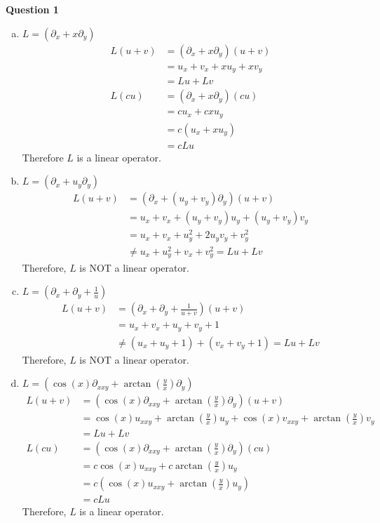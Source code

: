 \documentclass[12pt, letterpaper]{article}
\begin{document}
\graphicspath{ {./} }


\noindent \textbf{Question 1}
\begin{enumerate}[(a)]
    \item $L = (\partial_x + x\partial_y)$
    \begin{align*}
        L(u + v) &= (\partial_x + x\partial_y)(u+v) \\
        &= u_x + v_x + xu_y + xv_y \\
        &= Lu + Lv \\
        L(cu) &= (\partial_x + x\partial_y)(cu) \\
        &= cu_x + cxu_y \\
        &= c(u_x + xu_y) \\
        &= cLu
    \end{align*}
    Therefore $L$ is a linear operator.
    \item $L = (\partial_x + u_y\partial_y)$
    \begin{align*}
        L(u + v) &= (\partial_x + (u_y + v_y)\partial_y)(u+v) \\
        &= u_x + v_x + (u_y + v_y)u_y + (u_y + v_y)v_y \\
        &= u_x + v_x + u_y^2 + 2u_yv_y + v_y^2 \\
        &\ne u_x + u_y^2 + v_x + v_y^2 = Lu + Lv
    \end{align*}
    Therefore, $L$ is NOT a linear operator.
    \item $L = (\partial_x + \partial_y + \frac 1u)$
    \begin{align*}
        L(u + v) &= (\partial_x + \partial_y + \frac 1{u+v})(u+v) \\
        &= u_x + v_x + u_y + v_y + 1\\
        &\ne (u_x + u_y + 1) + (v_x + v_y + 1) = Lu + Lv
    \end{align*}
    Therefore, $L$ is NOT a linear operator.
    \item $L = (\cos(x)\partial_{xxy} + \arctan(\frac yx)\partial_y)$
    \begin{align*}
        L(u+v) &= (\cos(x)\partial_{xxy} + \arctan(\frac yx)\partial_y)(u+v) \\
        &= \cos(x)u_{xxy} + \arctan(\frac yx)u_y + \cos(x)v_{xxy} + \arctan(\frac yx)v_y \\
        &= Lu + Lv \\
        L(cu) &= (\cos(x)\partial_{xxy} + \arctan(\frac yx)\partial_y)(cu)\\
        &= c\cos(x)u_{xxy} + c\arctan(\frac yx)u_y \\
        &= c(\cos(x)u_{xxy} + \arctan(\frac yx)u_y) \\
        &= cLu
    \end{align*}
    Therefore, $L$ is a linear operator.
\end{enumerate}
\end{document}
